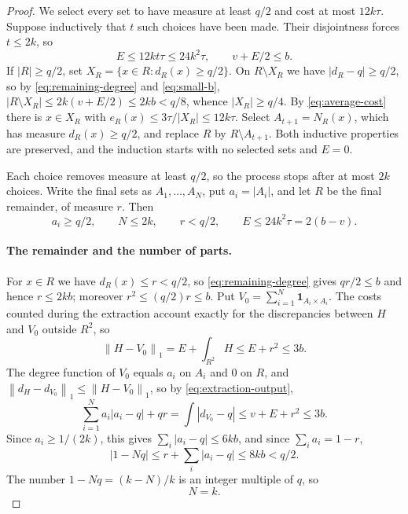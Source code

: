 \documentclass[11pt]{article}
\theoremstyle{remark}
\newcommand{\ind}{\mathbf{1}}
\newcommand{\norm}[1]{\left\lVert #1\right\rVert}
\newcommand{\abs}[1]{\left\lvert #1\right\rvert}
\begin{document}
\begin{proof}
We select every set to have measure at least $q/2$ and cost at most
$12k\tau$. Suppose inductively that $t$ such choices have been made.
Their disjointness forces $t\leq2k$, so
\begin{equation}\label{eq:total-cost-bound}
 E\leq12kt\tau\leq24k^2\tau,\qquad v+E/2\leq b .
\end{equation}
If $\abs R\geq q/2$, set $X_R=\{x\in R:d_R(x)\geq q/2\}$. On
$R\setminus X_R$ we have $\abs{d_R-q}\geq q/2$, so by
\eqref{eq:remaining-degree} and \eqref{eq:small-b},
$\abs{R\setminus X_R}\leq2k(v+E/2)\leq2kb<q/8$, whence
$\abs{X_R}\geq q/4$. By \eqref{eq:average-cost} there is $x\in X_R$ with
$e_R(x)\leq3\tau/\abs{X_R}\leq12k\tau$. Select $A_{t+1}=N_R(x)$, which
has measure $d_R(x)\geq q/2$, and replace $R$ by $R\setminus A_{t+1}$.
Both inductive properties are preserved, and the induction starts with no
selected sets and $E=0$.

Each choice removes measure at least $q/2$, so the process stops after
at most $2k$ choices. Write the final sets as $A_1,\ldots,A_N$, put
$a_i=\abs{A_i}$, and let $R$ be the final remainder, of measure $r$. Then
\begin{equation}\label{eq:extraction-output}
 a_i\geq q/2,\qquad N\leq2k,\qquad r<q/2,\qquad E\leq24k^2\tau=2(b-v).
\end{equation}

\paragraph{The remainder and the number of parts.}
For $x\in R$ we have $d_R(x)\leq r<q/2$, so
\eqref{eq:remaining-degree} gives $qr/2\leq b$ and hence $r\leq2kb$;
moreover $r^2\leq(q/2)r\leq b$. Put
$V_0=\sum_{i=1}^N\ind_{A_i\times A_i}$. The costs counted during the
extraction account exactly for the discrepancies between $H$ and $V_0$
outside $R^2$, so
\begin{equation}\label{eq:partial-cliques}
 \norm{H-V_0}_1=E+\int_{R^2}H\leq E+r^2\leq3b .
\end{equation}
The degree function of $V_0$ equals $a_i$ on $A_i$ and $0$ on $R$, and
$\norm{d_H-d_{V_0}}_1\leq\norm{H-V_0}_1$, so by
\eqref{eq:extraction-output},
\begin{equation}\label{eq:part-degrees}
 \sum_{i=1}^Na_i\abs{a_i-q}+qr=\int\abs{d_{V_0}-q}
 \leq v+E+r^2\leq3b .
\end{equation}
Since $a_i\geq1/(2k)$, this gives $\sum_i\abs{a_i-q}\leq6kb$, and since
$\sum_ia_i=1-r$,
\[
 \abs{1-Nq}\leq r+\sum_i\abs{a_i-q}\leq8kb<q/2 .
\]
The number $1-Nq=(k-N)/k$ is an integer multiple of $q$, so
\begin{equation}\label{eq:number-of-parts}
 N=k .
\end{equation}


\end{proof}
\end{document}
